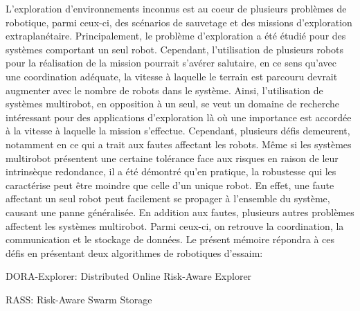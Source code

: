 L'exploration d'environnements inconnus est au coeur de plusieurs problèmes de robotique, parmi ceux-ci, des scénarios de sauvetage et des missions d'exploration extraplanétaire. Principalement, le problème d'exploration a été étudié pour des systèmes comportant un seul robot. Cependant, l'utilisation de plusieurs robots pour la réalisation de la mission pourrait s'avérer salutaire, en ce sens qu'avec une coordination adéquate, la vitesse à laquelle le terrain est parcouru devrait augmenter avec le nombre de robots dans le système. Ainsi, l'utilisation de systèmes multirobot, en opposition à un seul, se veut un domaine de recherche intéressant pour des applications d'exploration là où une importance est accordée à la vitesse à laquelle la mission s'effectue. Cependant, plusieurs défis demeurent, notamment en ce qui a trait aux fautes affectant les robots. Même si les systèmes multirobot présentent une certaine tolérance face aux risques en raison de leur intrinsèque redondance, il a été démontré qu'en pratique, la robustesse qui les caractérise peut être moindre que celle d'un unique robot. En effet, une faute affectant un seul robot peut facilement se propager à l'ensemble du système, causant une panne généralisée. En addition aux fautes, plusieurs autres problèmes affectent les systèmes multirobot. Parmi ceux-ci, on retrouve la coordination, la communication et le stockage de données. Le présent mémoire répondra à ces défis en présentant deux algorithmes de robotiques d'essaim:
\begin{compactitem} 
\item DORA-Explorer: Distributed Online Risk-Aware Explorer
\item RASS: Risk-Aware Swarm Storage 
\end{compactitem}
